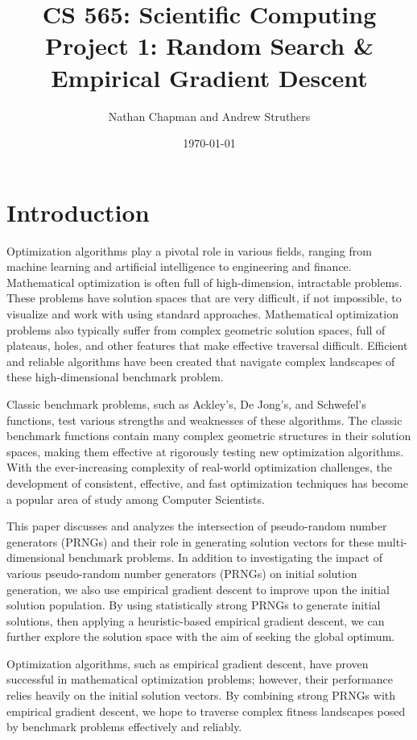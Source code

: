 \documentclass{article}
\title{\vspace*{-0.625in}CS 565: Scientific Computing \\ Project 1: Random Search \& Empirical Gradient Descent\vspace*{-0.25in}}
\author{Nathan Chapman and Andrew Struthers}
\date{\today}
\begin{document}
    \maketitle

\tableofcontents
\pagebreak
    \section{Introduction}

        Optimization algorithms play a pivotal role in various fields, ranging from machine learning and artificial intelligence to engineering and finance. Mathematical optimization is often full of high-dimension, intractable problems. These problems have solution spaces that are very difficult, if not impossible, to visualize and work with using standard approaches.  Mathematical optimization problems also typically suffer from complex geometric solution spaces, full of plateaus, holes, and other features that make effective traversal difficult. Efficient and reliable algorithms have been created that navigate complex landscapes of these high-dimensional benchmark problem. 

        Classic benchmark problems, such as Ackley's, De Jong's, and Schwefel's functions, test various strengths and weaknesses of these algorithms. The classic benchmark functions contain many complex geometric structures in their solution spaces, making them effective at rigorously testing new optimization algorithms. With the ever-increasing complexity of real-world optimization challenges, the development of consistent, effective, and fast optimization techniques has become a popular area of study among Computer Scientists. 

        This paper discusses and analyzes the intersection of pseudo-random number generators (PRNGs) and their role in generating solution vectors for these multi-dimensional benchmark problems. In addition to investigating the impact of various pseudo-random number generators (PRNGs) on initial solution generation, we also use empirical gradient descent to improve upon the initial solution population. By using statistically strong PRNGs to generate initial solutions, then applying a heuristic-based empirical gradient descent, we can further explore the solution space with the aim of seeking the global optimum.

        Optimization algorithms, such as empirical gradient descent, have proven successful in mathematical optimization problems; however, their performance relies heavily on the initial solution vectors. By combining strong PRNGs with empirical gradient descent, we hope to traverse complex fitness landscapes posed by benchmark problems effectively and reliably.
\end{document}
